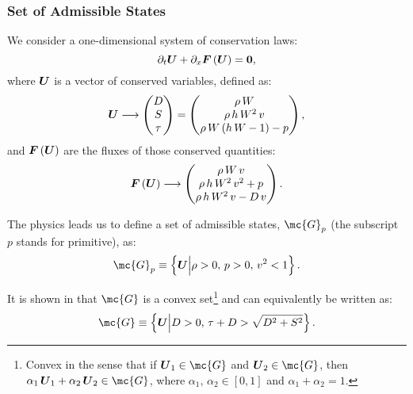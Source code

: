 \documentclass[10pt,preprint]{aastex}
\begin{document}
\subsubsection{Set of Admissible States}
We consider a one-dimensional system of conservation laws:
\begin{equation*}
    \pd{\vect{U}}{t} + \pd{\vect{F}\left(\vect{U}\right)}{x} = \vect{0},
\end{equation*}
where $\vect{U}$ is a vector of conserved variables, defined as:
\begin{equation}\label{Eq:ConservedVariables}
    \vect{U}\longrightarrow\begin{pmatrix} D\\ S\\ \tau\end{pmatrix}=\begin{pmatrix} \rho\,W\\ \rho\,h\,W^{2}\,v\\ \rho\,W\left(h\,W-1\right)-p\end{pmatrix},
\end{equation}
and $\vect{F}\left(\vect{U}\right)$ are the fluxes of those conserved quantities:
\begin{equation}\label{Eq:FluxVector}
    \vect{F}\left(\vect{U}\right)\longrightarrow\begin{pmatrix}\rho\,W\,v\\ \rho\,h\,W^{2}\,v^{2}+p\\\rho\,h\,W^{2}\,v-D\,v\end{pmatrix}.
\end{equation}


The physics leads us to define a set of admissible states, $\mc{G}_{p}$ (the subscript $p$ stands for primitive), as:
\begin{equation*}
    \mc{G}_{p}\equiv\left\{\vect{U}\Big|\rho>0,\,p>0,\,v^{2}<1\right\}.
\end{equation*}

It is shown in \citet{Mignone2005} that $\mc{G}$ is a convex set\footnote{Convex in the sense that if $\vect{U}_{1}\in\mc{G}$ and $\vect{U}_{2}\in\mc{G}$, then $\alpha_{1}\,\vect{U}_{1}+\alpha_{2}\,\vect{U}_{2}\in\mc{G}$, where $\alpha_{1},\,\alpha_{2}\in\left[0,1\right]$ and $\alpha_{1}+\alpha_{2}=1$.} and can equivalently be written as:
\begin{equation}\label{Eq:SetOfAdmissibleStates}
    \mc{G}\equiv\left\{\vect{U}\Big|D>0,\,\tau+D>\sqrt{D^{2}+S^{2}}\right\}.
\end{equation}
\end{document}
